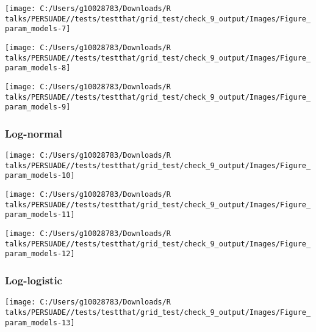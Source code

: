 \documentclass[
]{article}
\begin{document}
\begin{flushleft}\texttt{[image: C:/Users/g10028783/Downloads/R talks/PERSUADE//tests/testthat/grid\_test/check\_9\_output/Images/Figure\_param\_models-7]} \end{flushleft}

\begin{flushleft}\texttt{[image: C:/Users/g10028783/Downloads/R talks/PERSUADE//tests/testthat/grid\_test/check\_9\_output/Images/Figure\_param\_models-8]} \end{flushleft}

\begin{flushleft}\texttt{[image: C:/Users/g10028783/Downloads/R talks/PERSUADE//tests/testthat/grid\_test/check\_9\_output/Images/Figure\_param\_models-9]} \end{flushleft}

\clearpage

\subsubsection{Log-normal}\label{log-normal}

\begin{flushleft}\texttt{[image: C:/Users/g10028783/Downloads/R talks/PERSUADE//tests/testthat/grid\_test/check\_9\_output/Images/Figure\_param\_models-10]} \end{flushleft}

\begin{flushleft}\texttt{[image: C:/Users/g10028783/Downloads/R talks/PERSUADE//tests/testthat/grid\_test/check\_9\_output/Images/Figure\_param\_models-11]} \end{flushleft}

\begin{flushleft}\texttt{[image: C:/Users/g10028783/Downloads/R talks/PERSUADE//tests/testthat/grid\_test/check\_9\_output/Images/Figure\_param\_models-12]} \end{flushleft}

\clearpage

\subsubsection{Log-logistic}\label{log-logistic}

\begin{flushleft}\texttt{[image: C:/Users/g10028783/Downloads/R talks/PERSUADE//tests/testthat/grid\_test/check\_9\_output/Images/Figure\_param\_models-13]} \end{flushleft}
\end{document}
